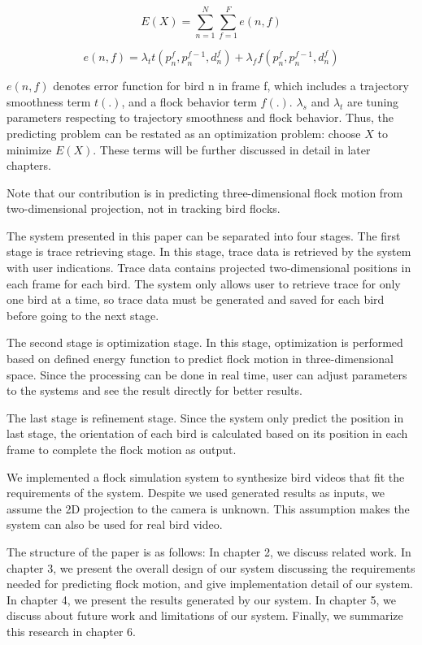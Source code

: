 \begin{equation}\label{eq:1}
 E(X) = \sum_{n = 1}^{N} \sum_{f = 1}^{F}e(n,f)
\end{equation}


\begin{equation}\label{eq:2}
 e(n,f) = \lambda_tt(p_n^f, p_n^{f-1},d_n^f) + \lambda_ff(p_n^f, p_n^{f-1},d_n^f)
\end{equation}


$e(n,f)$ denotes error function for bird n in frame f, which includes a trajectory smoothness term $t(.)$, and a flock behavior term $f(.)$. $\lambda_s$ and $\lambda_t$ are tuning parameters respecting to trajectory smoothness and flock behavior. Thus, the predicting problem can be restated as an optimization problem: choose $X$ to minimize $E(X)$. These terms will be further discussed in detail in later chapters.


Note that our contribution is in predicting three-dimensional flock motion from two-dimensional projection, not in tracking bird flocks.


The system presented in this paper can be separated into four stages. The first stage is trace retrieving stage. In this stage, trace data is retrieved by the system with user indications. Trace data contains projected two-dimensional positions in each frame for each bird. The system only allows user to retrieve trace for only one bird at a time, so trace data must be generated and saved for each bird before going to the next stage.


The second stage is optimization stage. In this stage, optimization is performed based on defined energy function to predict flock motion in three-dimensional space. Since the processing can be done in real time, user can adjust parameters to the systems and see the result directly for better results.


The last stage is refinement stage. Since the system only predict the position in last stage, the orientation of each bird is calculated based on its position in each frame to complete the flock motion as output.


We implemented a flock simulation system to synthesize bird videos that fit the requirements of the system. Despite we used generated results as inputs, we assume the 2D projection to the camera is unknown. This assumption makes the system can also be used for real bird video.


The structure of the paper is as follows: In chapter 2, we discuss related work. In chapter 3, we present the overall design of our system discussing the requirements needed for predicting flock motion, and give implementation detail of our system. In chapter 4, we present the results generated by our system. In chapter 5, we discuss about future work and limitations of our system. Finally, we summarize this research in chapter 6.

